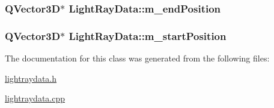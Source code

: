 \hypertarget{class_light_ray_data_ab7228a576b4b1c0843641e3706a6cb35}{
\subsubsection[{m\+\_\+end\+Position}]{\setlength{\rightskip}{0pt plus 5cm}Q\+Vector3\+D$\ast$ Light\+Ray\+Data\+::m\+\_\+end\+Position\hspace{0.3cm}{\ttfamily [protected]}}}\label{class_light_ray_data_ab7228a576b4b1c0843641e3706a6cb35}
\hypertarget{class_light_ray_data_a1da577bdf12b630015fca5d89712e479}{
\subsubsection[{m\+\_\+start\+Position}]{\setlength{\rightskip}{0pt plus 5cm}Q\+Vector3\+D$\ast$ Light\+Ray\+Data\+::m\+\_\+start\+Position\hspace{0.3cm}{\ttfamily [protected]}}}\label{class_light_ray_data_a1da577bdf12b630015fca5d89712e479}


The documentation for this class was generated from the following files\+:\begin{DoxyCompactItemize}
\item 
\hyperlink{lightraydata_8h}{lightraydata.\+h}\item 
\hyperlink{lightraydata_8cpp}{lightraydata.\+cpp}\end{DoxyCompactItemize}
